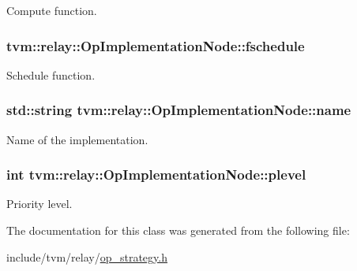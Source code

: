 Compute function. 

\subsubsection[{\texorpdfstring{fschedule}{fschedule}}]{ tvm\+::relay\+::\+Op\+Implementation\+Node\+::fschedule}\hypertarget{classtvm_1_1relay_1_1OpImplementationNode_a53fd916957cb15e070d736d12d8ced62}{}\label{classtvm_1_1relay_1_1OpImplementationNode_a53fd916957cb15e070d736d12d8ced62}


Schedule function. 

\subsubsection[{\texorpdfstring{name}{name}}]{\setlength{\rightskip}{0pt plus 5cm}std\+::string tvm\+::relay\+::\+Op\+Implementation\+Node\+::name}\hypertarget{classtvm_1_1relay_1_1OpImplementationNode_a25ff3bdfe97d3a8655aff45017a28610}{}\label{classtvm_1_1relay_1_1OpImplementationNode_a25ff3bdfe97d3a8655aff45017a28610}


Name of the implementation. 

\subsubsection[{\texorpdfstring{plevel}{plevel}}]{\setlength{\rightskip}{0pt plus 5cm}int tvm\+::relay\+::\+Op\+Implementation\+Node\+::plevel}\hypertarget{classtvm_1_1relay_1_1OpImplementationNode_af7afc9d22e58ead1fc342808ed0c4304}{}\label{classtvm_1_1relay_1_1OpImplementationNode_af7afc9d22e58ead1fc342808ed0c4304}


Priority level. 



The documentation for this class was generated from the following file\+:\begin{DoxyCompactItemize}
\item 
include/tvm/relay/\hyperlink{op__strategy_8h}{op\+\_\+strategy.\+h}\end{DoxyCompactItemize}
